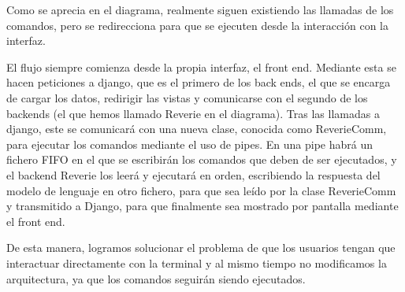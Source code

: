 Como se aprecia en el diagrama, realmente siguen existiendo las llamadas de los comandos, pero se redirecciona para que se ejecuten desde la interacción con la interfaz. 

El flujo siempre comienza desde la propia interfaz, el front end. Mediante esta se hacen peticiones a django, que es el primero de los back ends, el que se encarga de cargar los datos, redirigir las vistas y comunicarse con el segundo de los backends (el que hemos llamado Reverie en el diagrama). Tras las llamadas a django, este se comunicará con una nueva clase, conocida como ReverieComm, para ejecutar los comandos mediante el uso de pipes. En una pipe habrá un fichero FIFO en el que se escribirán los comandos que deben de ser ejecutados, y el backend Reverie los leerá y ejecutará en orden, escribiendo la respuesta del modelo de lenguaje en otro fichero, para que sea leído por la clase ReverieComm y transmitido a Django, para que finalmente sea mostrado por pantalla mediante el front end.

De esta manera, logramos solucionar el problema de que los usuarios tengan que interactuar directamente con la terminal y al mismo tiempo no modificamos la arquitectura, ya que los comandos seguirán siendo ejecutados. 

